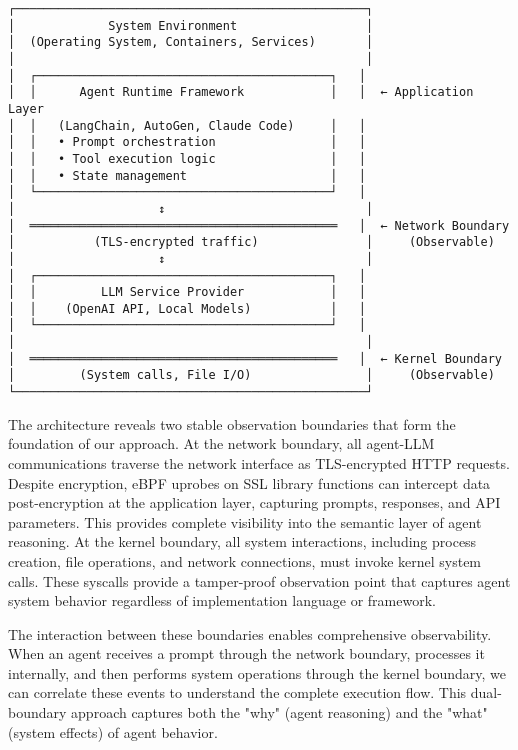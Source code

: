 \begin{center}
\begin{Verbatim}[fontsize=\small, commandchars=\\\{\}]
┌─────────────────────────────────────────────────┐
│             System Environment                  │
│  (Operating System, Containers, Services)       │
│                                                 │
│  ┌─────────────────────────────────────────┐   │
│  │      Agent Runtime Framework            │   │  ← Application Layer
│  │   (LangChain, AutoGen, Claude Code)     │   │
│  │   • Prompt orchestration                │   │
│  │   • Tool execution logic                │   │
│  │   • State management                    │   │
│  └─────────────────────────────────────────┘   │
│                    ↕                            │
│  ═══════════════════════════════════════════   │  ← Network Boundary
│           (TLS-encrypted traffic)               │     (Observable)
│                    ↕                            │
│  ┌─────────────────────────────────────────┐   │
│  │         LLM Service Provider            │   │
│  │    (OpenAI API, Local Models)           │   │
│  └─────────────────────────────────────────┘   │
│                                                 │
│  ═══════════════════════════════════════════   │  ← Kernel Boundary
│         (System calls, File I/O)                │     (Observable)
└─────────────────────────────────────────────────┘
\end{Verbatim}
\end{center}

The architecture reveals two stable observation boundaries that form the foundation of our approach. At the network boundary, all agent-LLM communications traverse the network interface as TLS-encrypted HTTP requests. Despite encryption, eBPF uprobes on SSL library functions can intercept data post-encryption at the application layer, capturing prompts, responses, and API parameters. This provides complete visibility into the semantic layer of agent reasoning. At the kernel boundary, all system interactions, including process creation, file operations, and network connections, must invoke kernel system calls. These syscalls provide a tamper-proof observation point that captures agent system behavior regardless of implementation language or framework.

The interaction between these boundaries enables comprehensive observability. When an agent receives a prompt through the network boundary, processes it internally, and then performs system operations through the kernel boundary, we can correlate these events to understand the complete execution flow. This dual-boundary approach captures both the "why" (agent reasoning) and the "what" (system effects) of agent behavior.

